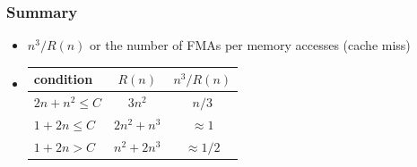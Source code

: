 \documentclass[12pt,dvipdfmx]{beamer}
\begin{document}

\begin{frame}
\frametitle{Summary}
\begin{itemize}
\item $n^3 / R(n)$ or the number of FMAs per memory accesses (cache miss)
\item []
\begin{center}
\begin{tabular}{|l|c|c|}\hline
condition         & $R(n)$       & $n^3/R(n)$ \\\hline
$2n + n^2 \leq C$ & $3n^2$       & $n/3$ \\
$1 + 2n \leq C$   & $2n^2 + n^3$ & $\approx 1$ \\ 
$1 + 2n > C$      & $n^2 + 2n^3$ & $\approx 1/2$ \\\hline
\end{tabular}
\end{center}
\end{itemize}
\end{frame}
\end{document}
